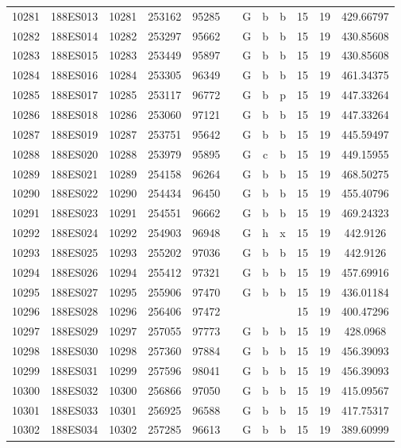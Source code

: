 \begin{tabular}{|*{12}{c|}}
10281 & 188ES013 & 10281 & 253162 & 95285 &  & G & b & b & 15 & 19 & 429.66797 \\ 
10282 & 188ES014 & 10282 & 253297 & 95662 &  & G & b & b & 15 & 19 & 430.85608 \\ 
10283 & 188ES015 & 10283 & 253449 & 95897 &  & G & b & b & 15 & 19 & 430.85608 \\ 
10284 & 188ES016 & 10284 & 253305 & 96349 &  & G & b & b & 15 & 19 & 461.34375 \\ 
10285 & 188ES017 & 10285 & 253117 & 96772 &  & G & b & p & 15 & 19 & 447.33264 \\ 
10286 & 188ES018 & 10286 & 253060 & 97121 &  & G & b & b & 15 & 19 & 447.33264 \\ 
10287 & 188ES019 & 10287 & 253751 & 95642 &  & G & b & b & 15 & 19 & 445.59497 \\ 
10288 & 188ES020 & 10288 & 253979 & 95895 &  & G & c & b & 15 & 19 & 449.15955 \\ 
10289 & 188ES021 & 10289 & 254158 & 96264 &  & G & b & b & 15 & 19 & 468.50275 \\ 
10290 & 188ES022 & 10290 & 254434 & 96450 &  & G & b & b & 15 & 19 & 455.40796 \\ 
10291 & 188ES023 & 10291 & 254551 & 96662 &  & G & b & b & 15 & 19 & 469.24323 \\ 
10292 & 188ES024 & 10292 & 254903 & 96948 &  & G & h & x & 15 & 19 & 442.9126 \\ 
10293 & 188ES025 & 10293 & 255202 & 97036 &  & G & b & b & 15 & 19 & 442.9126 \\ 
10294 & 188ES026 & 10294 & 255412 & 97321 &  & G & b & b & 15 & 19 & 457.69916 \\ 
10295 & 188ES027 & 10295 & 255906 & 97470 &  & G & b & b & 15 & 19 & 436.01184 \\ 
10296 & 188ES028 & 10296 & 256406 & 97472 &  &  &  &  & 15 & 19 & 400.47296 \\ 
10297 & 188ES029 & 10297 & 257055 & 97773 &  & G & b & b & 15 & 19 & 428.0968 \\ 
10298 & 188ES030 & 10298 & 257360 & 97884 &  & G & b & b & 15 & 19 & 456.39093 \\ 
10299 & 188ES031 & 10299 & 257596 & 98041 &  & G & b & b & 15 & 19 & 456.39093 \\ 
10300 & 188ES032 & 10300 & 256866 & 97050 &  & G & b & b & 15 & 19 & 415.09567 \\ 
10301 & 188ES033 & 10301 & 256925 & 96588 &  & G & b & b & 15 & 19 & 417.75317 \\ 
10302 & 188ES034 & 10302 & 257285 & 96613 &  & G & b & b & 15 & 19 & 389.60999 \\ 

\end{tabular}
